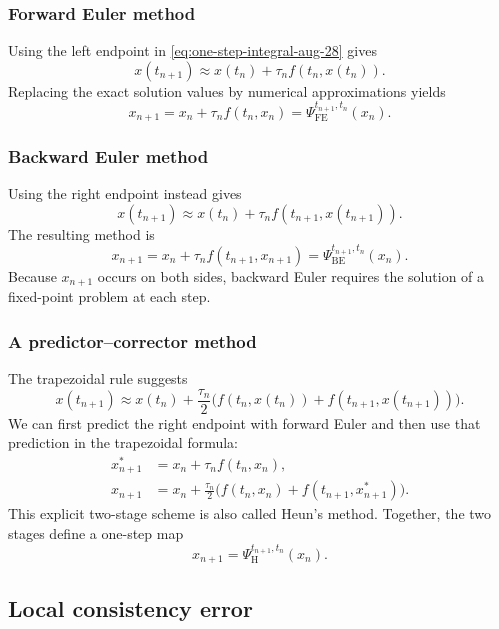 \subsubsection{Forward Euler method}

Using the left endpoint in \eqref{eq:one-step-integral-aug-28} gives
\[
  x(t_{n+1})
  \approx x(t_n)+\tau_n f(t_n,x(t_n)).
\]
Replacing the exact solution values by numerical approximations yields
\begin{equation}\label{eq:forward-euler-aug-28}
  x_{n+1}=x_n+\tau_n f(t_n,x_n)
  =\Psi_{\mathrm{FE}}^{t_{n+1},t_n}(x_n).
\end{equation}

\subsubsection{Backward Euler method}

Using the right endpoint instead gives
\[
  x(t_{n+1})
  \approx x(t_n)+\tau_n f(t_{n+1},x(t_{n+1})).
\]
The resulting method is
\begin{equation}\label{eq:backward-euler-aug-28}
  x_{n+1}=x_n+\tau_n f(t_{n+1},x_{n+1})
  =\Psi_{\mathrm{BE}}^{t_{n+1},t_n}(x_n).
\end{equation}
Because $x_{n+1}$ occurs on both sides, backward Euler requires the
solution of a fixed-point problem at each step.

\subsubsection{A predictor--corrector method}

The trapezoidal rule suggests
\[
  x(t_{n+1})\approx x(t_n)
  +\frac{\tau_n}{2}
   \bigl(f(t_n,x(t_n))+f(t_{n+1},x(t_{n+1}))\bigr).
\]
We can first predict the right endpoint with forward Euler and then use
that prediction in the trapezoidal formula:
\begin{align}
  x_{n+1}^*
  &=x_n+\tau_n f(t_n,x_n),
    \label{eq:heun-predictor-aug-28}\\
  x_{n+1}
  &=x_n+\frac{\tau_n}{2}
    \bigl(f(t_n,x_n)+f(t_{n+1},x_{n+1}^*)\bigr).
    \label{eq:heun-corrector-aug-28}
\end{align}
This explicit two-stage scheme is also called Heun's method. Together,
the two stages define a one-step map
\[
  x_{n+1}=\Psi_{\mathrm{H}}^{t_{n+1},t_n}(x_n).
\]

\subsection{Local consistency error}

